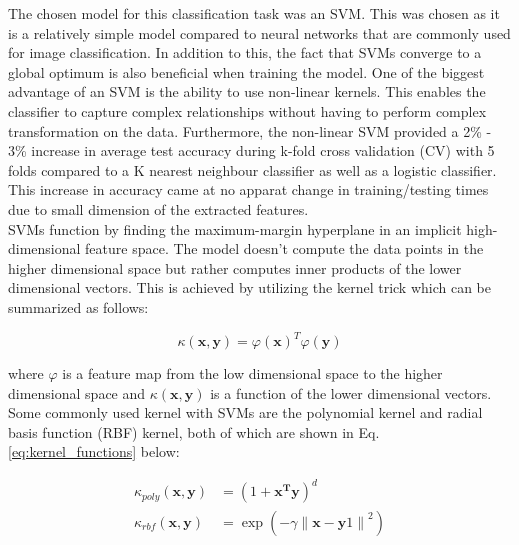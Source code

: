 \documentclass{article}
\begin{document}
    	The chosen model for this classification task was an SVM. This was chosen as it is a relatively simple model compared to neural networks that are commonly used for image classification. In addition to this, the fact that SVMs converge to a global optimum is also beneficial when training the model. One of the biggest advantage of an SVM is the ability to use non-linear kernels. This enables the classifier to capture complex relationships without having to perform complex transformation on the data. Furthermore, the non-linear SVM provided a 2\% - 3\% increase in average test accuracy during k-fold cross validation (CV) with 5 folds compared to a K nearest neighbour classifier as well as a logistic classifier. This increase in accuracy came at no apparat change in training/testing times due to small dimension of the extracted features.
    	\\
    	
    	SVMs function by finding the maximum-margin hyperplane in an implicit high-dimensional feature space. The model doesn't compute the data points in the higher dimensional space but rather computes inner products of the lower dimensional vectors. This is achieved by utilizing the kernel trick which can be summarized as follows:
    	
    	\begin{equation}
    		\kappa\left(\boldsymbol{x}, \boldsymbol{y}\right) = \varphi\left(\boldsymbol{x}\right)^T\varphi\left(\boldsymbol{y}\right)
    	\end{equation}
    	
    	where $\varphi$ is a feature map from the low dimensional space to the higher dimensional space and $\kappa\left(\boldsymbol{x}, \boldsymbol{y}\right)$ is a function of the lower dimensional vectors. Some commonly used kernel with SVMs are the polynomial kernel and radial basis function (RBF) kernel, both of which are shown in Eq. \ref{eq:kernel_functions} below:
    	
    	\begin{equation}
    		\label{eq:kernel_functions}
    		\begin{split}
    			\kappa_{poly}\left(\boldsymbol{x}, \boldsymbol{y}\right) &= \left(1 + \boldsymbol{x^{T}}\boldsymbol{y}\right)^d \\
    			\kappa_{rbf}\left(\boldsymbol{x}, \boldsymbol{y}\right) &= \exp\left(-\gamma\left\lVert\boldsymbol{x}-\boldsymbol{y}1\right\rVert^2\right)
    		\end{split}
    	\end{equation}
    
\end{document}
